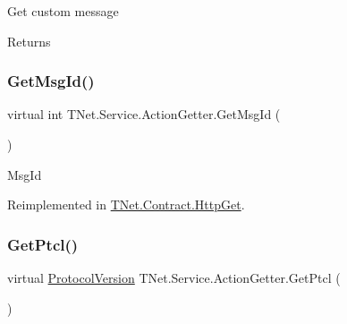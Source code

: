 Get custom message 

\begin{DoxyReturn}{Returns}

\end{DoxyReturn}
\mbox{\label{class_t_net_1_1_service_1_1_action_getter_a006cdd9ff390b8960732054f3df96d90}} 
\subsubsection{\texorpdfstring{Get\+Msg\+Id()}{GetMsgId()}}
{\footnotesize\ttfamily virtual int T\+Net.\+Service.\+Action\+Getter.\+Get\+Msg\+Id (\begin{DoxyParamCaption}{ }\end{DoxyParamCaption})\hspace{0.3cm}{\ttfamily [virtual]}}



Msg\+Id 



Reimplemented in \mbox{\hyperlink{class_t_net_1_1_contract_1_1_http_get_a2e0ab50edf56ff86cb8d4c1ed1543f38}{T\+Net.\+Contract.\+Http\+Get}}.

\mbox{\label{class_t_net_1_1_service_1_1_action_getter_aea751fe82e12246f5be7105d8c8c068c}} 
\subsubsection{\texorpdfstring{Get\+Ptcl()}{GetPtcl()}}
{\footnotesize\ttfamily virtual \mbox{\hyperlink{namespace_t_net_1_1_service_a6651119df6dac62b849ed58cf7ece2bd}{Protocol\+Version}} T\+Net.\+Service.\+Action\+Getter.\+Get\+Ptcl (\begin{DoxyParamCaption}{ }\end{DoxyParamCaption})\hspace{0.3cm}{\ttfamily [virtual]}}





